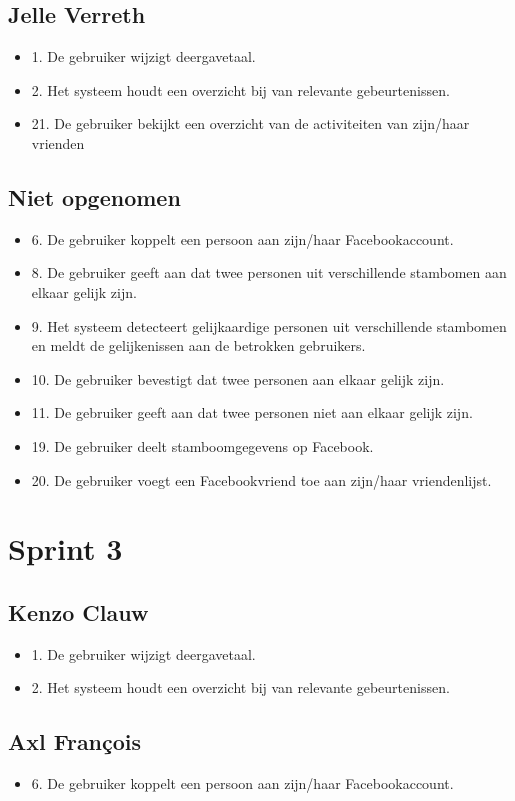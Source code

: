 \documentclass[pdftex,a4paper,12pt,twoside]{report}
\begin{document}
\subsection{Jelle Verreth}
\begin{itemize}
\item 1. De gebruiker wijzigt deergavetaal. 
\item 2. Het systeem houdt een overzicht bij van relevante gebeurtenissen. 
\item 21. De gebruiker bekijkt een overzicht van de activiteiten van zijn/haar vrienden
\end{itemize}
\subsection{Niet opgenomen}
\begin{itemize}
\item 6. De gebruiker koppelt een persoon aan zijn/haar Facebookaccount. 
\item 8. De gebruiker geeft aan dat twee personen uit verschillende stambomen aan elkaar gelijk zijn. 
\item 9. Het systeem detecteert gelijkaardige personen uit verschillende stambomen en meldt de 
gelijkenissen aan de betrokken gebruikers. 
\item 10. De gebruiker bevestigt dat twee personen aan elkaar gelijk zijn. 
\item 11. De gebruiker geeft aan dat twee personen niet aan elkaar gelijk zijn.
\item 19. De gebruiker deelt stamboomgegevens op Facebook. 
\item 20. De gebruiker voegt een Facebookvriend toe aan zijn/haar vriendenlijst. 
\end{itemize}
  
\section{Sprint 3}

\subsection{Kenzo Clauw}
\begin{itemize}
\item 1. De gebruiker wijzigt deergavetaal. 
\item 2. Het systeem houdt een overzicht bij van relevante gebeurtenissen. 
\end{itemize}
\subsection{Axl François}
\begin{itemize}
\item 6. De gebruiker koppelt een persoon aan zijn/haar Facebookaccount.
\end{itemize}
\end{document}
